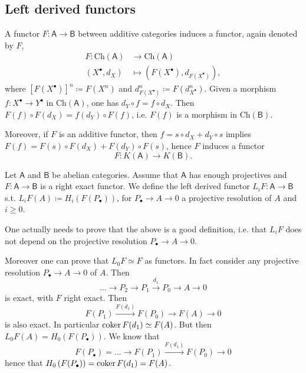 \subsection{Left derived functors}
\begin{rem}[]
	A functor $F\colon\mathsf{A} \to \mathsf{B}$ between additive categories
	induces a functor, again denoted by $F$, 
	\begin{align}
		F\colon\mathrm{Ch}(\mathsf{A}) &\to \mathrm{Ch}(\mathsf{A}) \\
		\left( X^{\bullet}, d_{X} \right) &\mapsto \left( F(X^{\bullet}), d_{F(X^\bullet)} \right)
	,\end{align} 
	where $\left[ F(X^\bullet) \right]^n \coloneqq F(X^n)$ and $d_{F(X^\bullet)}^n \coloneqq F(d^n_{X^\bullet})$.
	Given a morphism $f\colon X^\bullet \to Y^\bullet$ in $\mathrm{Ch}(\mathsf{A})$, one has
	$d_Y \circ f = f \circ d_X$.
	Then $F(f) \circ F(d_X) = f(d_Y) \circ F(f)$, i.e. $F(f)$ is a morphism in $\mathrm{Ch}(\mathsf{B})$.

	Moreover, if $F$ is an additive functor, then
	$f = s \circ d_X + d_Y \circ s$ implies
	$F(f) = F(s) \circ F(d_X) + F(d_Y) \circ F(s)$,
	hence $F$ induces a functor
	\begin{equation}
		F\colon K(\mathsf{A}) \to K(\mathsf{B})
	.\end{equation} 
\end{rem}

\begin{defn}
	Let $\mathsf{A}$ and $\mathsf{B}$ be abelian categories.
	Assume that $\mathsf{A}$ has enough projectives and $F\colon \mathsf{A} \to \mathsf{B}$
	is a right exact functor.
	We define the left derived functor $L_iF\colon\mathsf{A} \to \mathsf{B}$
	s.t. $L_iF(A) \coloneqq H_i \left( F(P_{\bullet}) \right)$, 
	for $P_{\bullet} \to A \to 0$ a projective resolution of $A$
	and $i \geq 0$.
\end{defn}

\begin{rem}[]
	One actually needs to prove that the above is a good definition, i.e.
	that $L_i F$ does not depend on the projective resolution $P_{\bullet} \to A \to 0$.

	Moreover one can prove that $L_0F \simeq F$ as functors.
	In fact consider any projective resolution $P_{\bullet} \to A \to 0$ of $A$. Then
	\begin{equation}
	\ldots \to P_2 \to P_1 \xrightarrow{d_1} P_0 \to A \to 0
	\end{equation} 
	is exact, with $F$ right exact.
	Then 
	\begin{equation}
		F(P_1) \xrightarrow{F(d_1)} F(P_0) \to F(A) \to 0
	\end{equation} 
	is also exact.
	In particular $\operatorname{coker} F(d_1) \simeq F(A)$.
	But then $L_0 F(A) = H_0 \left( F(P_{\bullet}) \right)$.
	We know that
	\begin{equation}
		F(P_{\bullet}) = \ldots \to F(P_1) \xrightarrow{F(d_1)} F(P_0) \to 0
	\end{equation} 
	hence that $H_0 \left( F(P_{\bullet}) \right) = \operatorname{coker} F(d_1) = F(A)$.
\end{rem}

